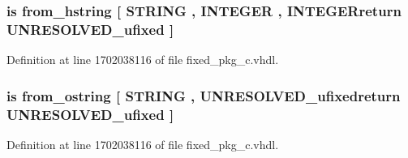 \subsubsection[{from\+\_\+hex\+\_\+string}]{ {\bfseries \textcolor{keywordflow}{is}\textcolor{vhdlchar}{ }\textcolor{vhdlchar}{from\+\_\+hstring}\textcolor{vhdlchar}{ }\textcolor{vhdlchar}{\mbox{[}}\textcolor{vhdlchar}{ }\textcolor{comment}{S\+T\+R\+I\+N\+G}\textcolor{vhdlchar}{ }\textcolor{vhdlchar}{,}\textcolor{vhdlchar}{ }\textcolor{comment}{I\+N\+T\+E\+G\+E\+R}\textcolor{vhdlchar}{ }\textcolor{vhdlchar}{,}\textcolor{vhdlchar}{ }\textcolor{vhdlchar}{I\+N\+T\+E\+G\+E\+Rreturn}\textcolor{vhdlchar}{ }{\bfseries {\bf U\+N\+R\+E\+S\+O\+L\+V\+E\+D\+\_\+ufixed}} \textcolor{vhdlchar}{ }\textcolor{vhdlchar}{\mbox{]}}\textcolor{vhdlchar}{ }} \hspace{0.3cm}{\ttfamily [Alias]}}\label{classfixed__pkg_a03b95d27d5faeed595b531a2333e9947}


Definition at line 1702038116 of file fixed\+\_\+pkg\+\_\+c.\+vhdl.

\hypertarget{classfixed__pkg_ae8e9e937706e3de2328aaadf3a10856b}{}
\subsubsection[{from\+\_\+octal\+\_\+string}]{ {\bfseries \textcolor{keywordflow}{is}\textcolor{vhdlchar}{ }\textcolor{vhdlchar}{from\+\_\+ostring}\textcolor{vhdlchar}{ }\textcolor{vhdlchar}{\mbox{[}}\textcolor{vhdlchar}{ }\textcolor{comment}{S\+T\+R\+I\+N\+G}\textcolor{vhdlchar}{ }\textcolor{vhdlchar}{,}\textcolor{vhdlchar}{ }\textcolor{vhdlchar}{U\+N\+R\+E\+S\+O\+L\+V\+E\+D\+\_\+ufixedreturn}\textcolor{vhdlchar}{ }{\bfseries {\bf U\+N\+R\+E\+S\+O\+L\+V\+E\+D\+\_\+ufixed}} \textcolor{vhdlchar}{ }\textcolor{vhdlchar}{\mbox{]}}\textcolor{vhdlchar}{ }} \hspace{0.3cm}{\ttfamily [Alias]}}\label{classfixed__pkg_ae8e9e937706e3de2328aaadf3a10856b}


Definition at line 1702038116 of file fixed\+\_\+pkg\+\_\+c.\+vhdl.

\hypertarget{classfixed__pkg_ad03780406d82a1039546103c01b05ab0}{}
